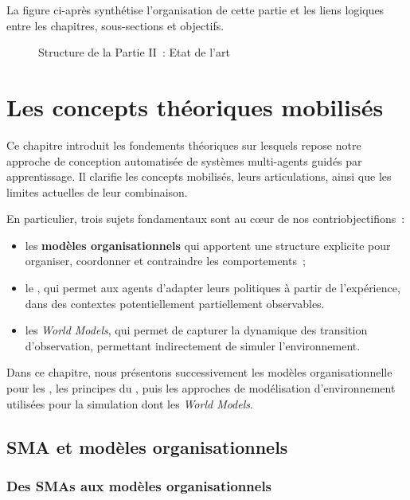 La figure ci-après synthétise l'organisation de cette partie et les liens logiques entre les chapitres, sous-sections et objectifs.


\begin{figure}[h!]
  \centering
  \resizebox{\textwidth}{!}{%
    
  }
  \caption{Structure de la Partie II~: Etat de l'art}
  \label{fig:organisation_manuscrit_partie_2}
\end{figure}

\clearpage
\thispagestyle{empty}
\null
\newpage

\chapter{Les concepts théoriques mobilisés}
\label{chap:concepts}

\noindent
Ce chapitre introduit les fondements théoriques sur lesquels repose notre approche de conception automatisée de systèmes multi-agents guidés par apprentissage. Il clarifie les concepts mobilisés, leurs articulations, ainsi que les limites actuelles de leur combinaison.

En particulier, trois sujets fondamentaux sont au cœur de nos contriobjectifions~:
\begin{itemize}
  \item les \textbf{modèles organisationnels} qui apportent une structure explicite pour organiser, coordonner et contraindre les comportements~;
  \item le , qui permet aux agents d'adapter leurs politiques à partir de l'expérience, dans des contextes potentiellement partiellement observables.
  \item les \textit{World Models}, qui permet de capturer la dynamique des transition d'observation, permettant indirectement de simuler l'environnement.
\end{itemize}

Dans ce chapitre, nous présentons successivement les modèles organisationnelle pour les , les principes du , puis les approches de modélisation d'environnement utilisées pour la simulation dont les \textit{World Models}.


\section{SMA et modèles organisationnels}

\subsection{Des SMAs aux modèles organisationnels}


